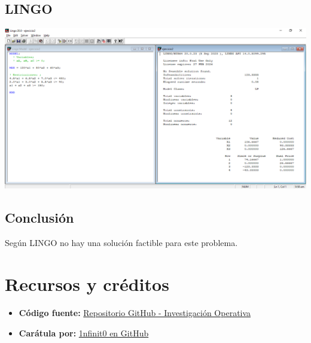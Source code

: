 \documentclass[12pt]{article}
\begin{document}
\subsection*{LINGO}

\begin{center}
  \includegraphics[width=1\textwidth]{./assets/ejercicio2.PNG}
\end{center}

\subsection*{Conclusión}
\noindent Según LINGO no hay una solución factible para este problema.

\newpage
\section*{Recursos y créditos}

\begin{itemize}
    \item \textbf{Código fuente:} \href{https://github.com/MateoTVara/C08-InvestigacionOperativa}{Repositorio GitHub - Investigación Operativa}
    \item \textbf{Carátula por:} \href{https://github.com/1nfinit0}{1nfinit0 en GitHub}
\end{itemize}
\end{document}
